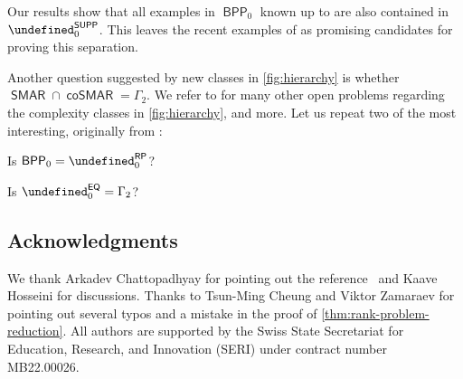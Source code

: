\documentclass[conference]{IEEEtran}
\newcommand{\cplxclass}[1]{\mathsf{#1}}
\let\P\undefined\DeclareMathOperator{\P}{\cplxclass{P}}
\DeclareMathOperator{\BPP}{\cplxclass{BPP}}
\DeclareMathOperator{\SUPP}{\cplxclass{SUPP}}
\DeclareMathOperator{\RP}{\cplxclass{RP}}
\DeclareMathOperator{\SMAR}{\cplxclass{SMAR}}
\DeclareMathOperator{\coSMAR}{\cplxclass{coSMAR}}
\newcommand{\EQ}{\mathsf{EQ}}
\begin{document}
Our results show that all examples in $\BPP_0$ known up to \cite{FGHH25} are
also contained in $\P_0^{\SUPP}$. This leaves the recent examples of \cite{SS24}
as promising candidates for proving this separation.

Another question suggested by new classes in \cref{fig:hierarchy} is whether $\SMAR \cap \coSMAR = \Gamma_2$. We refer to \cite{HH24} for many other open problems regarding the complexity classes
in \cref{fig:hierarchy}, and more. Let us repeat two of the most interesting, originally from \cite{HHH22}:

\begin{question}
    Is  $\BPP_0 = \P_0^{\RP}$?
\end{question}

\begin{question}
    Is $\P_0^\EQ = \Gamma_2$?
\end{question}

\subsection*{Acknowledgments}
We thank Arkadev Chattopadhyay for pointing out the reference~\cite{HP2010} and
Kaave Hosseini for discussions. Thanks to Tsun-Ming Cheung and Viktor Zamaraev
for pointing out several typos and a mistake in the proof of
\cref{thm:rank-problem-reduction}. All authors are supported by the Swiss State
Secretariat for Education, Research, and Innovation (SERI) under contract number
MB22.00026.

\renewcommand{\path}[1]{\Doi{#1}}
\renewcommand{\url}[1]{\href{#1}{\Doi{#1}}}


\end{document}
